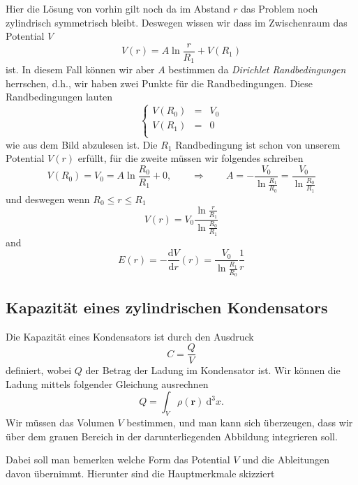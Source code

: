 \documentclass[A4paper, 12pt]{amsart}
\begin{document}
Hier die Lösung von vorhin gilt noch da im Abstand
$ r $ das Problem noch zylindrisch symmetrisch bleibt.
Deswegen wissen wir dass im Zwischenraum das Potential $ V $
\begin{equation}
  V(r) =
  A \ln \frac{r}{R_{1}}
  +
  V(R_{1})
\end{equation}
ist.
In diesem Fall können wir aber $ A $ bestimmen da
\textit{Dirichlet Randbedingungen}
herrschen, d.h., wir haben zwei Punkte für die Randbedingungen.
Diese Randbedingungen lauten
%
\begin{equation*}
  \left\{
    \begin{matrix}
      V(R_{0}) & = & V_{0} \\
      V(R_{1}) & = & 0 \\
    \end{matrix}
  \right.
\end{equation*}
%
wie aus dem Bild abzulesen ist.
Die $ R_{1} $ Randbedingung ist schon von unserem Potential $ V(r) $ erfüllt,
für die zweite müssen wir folgendes schreiben
%
\begin{equation*}
  V(R_{0}) = V_{0} =
  A \ln \frac{R_{0}}{R_{1}}
  +
  0,
  \qquad \Rightarrow \qquad
  A =
  -
  \frac{V_{0}}{\ln \frac{R_{1}}{R_{0}}}
  =
  \frac{V_{0}}{\ln \frac{R_{0}}{R_{1}}}
\end{equation*}
%
und deswegen wenn $ R_{0} \leq r \leq R_{1} $
\begin{equation*}
  V(r) =
  V_{0}
  \frac{\ln \frac{r}{R_{1}}}{\ln \frac{R_{0}}{R_{1}}}
\end{equation*}
and
\begin{equation*}
  E(r) =
  - \frac{\mathrm{d}V}{\mathrm{d}r}(r)
  =
  \frac{V_{0}}{\ln \frac{R_{1}}{R_{0}}}
  \frac{1}{r}
\end{equation*}

\subsection{Kapazität eines zylindrischen Kondensators}

Die Kapazität eines Kondensators ist durch den Ausdruck
%
\begin{equation*}
  C = \frac{Q}{V}
\end{equation*}
%
definiert, wobei $ Q $ der Betrag der Ladung im Kondensator ist.
Wir können die Ladung mittels folgender Gleichung ausrechnen
%
\begin{equation*}
  Q =
  \int_{V}
    \rho (\mathbf{r})
  \ \mathrm{d}^{3}x
  .
\end{equation*}
%
Wir müssen das Volumen $ V $ bestimmen, und man kann sich überzeugen,
dass wir über dem grauen Bereich in der darunterliegenden Abbildung
integrieren soll.
\begin{center}
  
\end{center}

Dabei soll man bemerken welche Form das Potential $ V $ und die Ableitungen
davon übernimmt. Hierunter sind die Hauptmerkmale skizziert
\begin{center}
  
\end{center}
\end{document}
